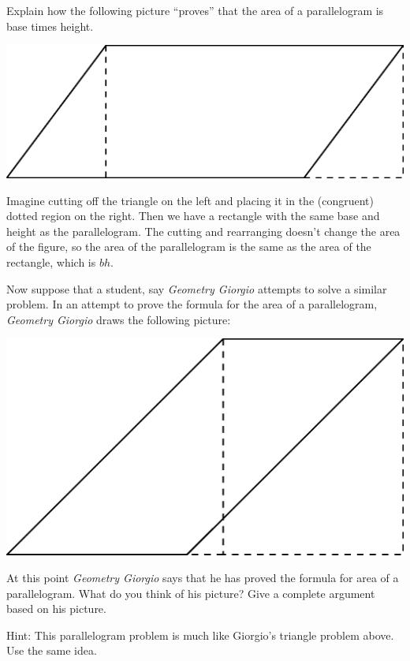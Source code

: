 \documentclass[nooutcomes]{ximera}
\begin{document}
\begin{problem}
Explain how the following picture ``proves'' that the area of a
  parallelogram is base times height.
\begin{image}
\includegraphics{para3.png}
\end{image}
\begin{freeResponse}
\begin{hint}
Imagine cutting off the triangle on the left and placing it in the (congruent) dotted region on the right.  Then we have a rectangle with the same base and height as the parallelogram.  The cutting and rearranging doesn't change the area of the figure, so the area of the parallelogram is the same as the area of the rectangle, which is $bh$. 
\end{hint}
\end{freeResponse}
\end{problem}

\begin{problem}
Now suppose that a student, say \textit{Geometry Giorgio} attempts to
solve a similar problem. In an attempt to prove the formula for the
area of a parallelogram, \textit{Geometry Giorgio} draws the following
picture:
\begin{image}
\includegraphics{paragiorgio.png}
\end{image}
At this point \textit{Geometry Giorgio} says that he has proved the
formula for area of a parallelogram. What do you think of his picture?
Give a complete argument based on his picture.
\begin{freeResponse}
\begin{hint}
Hint:  This parallelogram problem is much like Giorgio's triangle problem above.  Use the same idea.  
\end{hint}
\end{freeResponse}
\end{problem}
\end{document}

